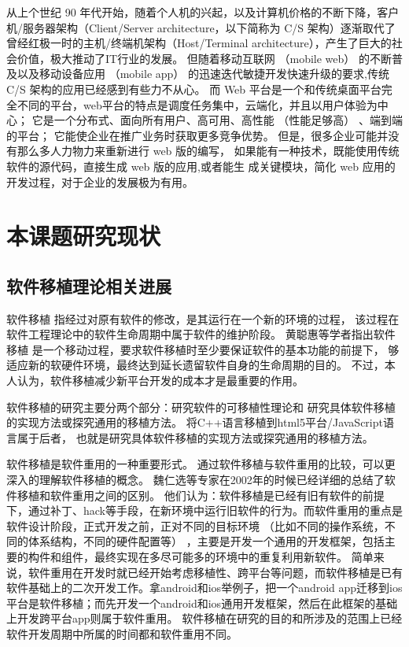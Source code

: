 从上个世纪 90 年代开始，随着个人机的兴起，以及计算机价格的不断下降，客户机/服务器架构（Client/Server architecture，以下简称为 C/S 架构）逐渐取代了
曾经红极一时的主机/终端机架构（Host/Terminal architecture），产生了巨大的社会价值，极大推动了IT行业的发展。
但随着移动互联网 （mobile web） 的不断普及以及移动设备应用 （mobile app） 的迅速迭代敏捷开发快速升级的要求,传统 C/S 架构的应用已经感到有些力不从心。
而 Web 平台是一个和传统桌面平台完全不同的平台，web平台的特点是调度任务集中，云端化，并且以用户体验为中心；
它是一个分布式、面向所有用户、高可用、高性能 （性能足够高） 、端到端的平台；
它能使企业在推广业务时获取更多竞争优势。
但是，很多企业可能并没有那么多人力物力来重新进行 web 版的编写，
如果能有一种技术，既能使用传统软件的源代码，直接生成 web 版的应用,或者能生 
成关键模块，简化 web 应用的开发过程，对于企业的发展极为有用。

\section{本课题研究现状}

\subsection{软件移植理论相关进展}

软件移植
指经过对原有软件的修改，是其运行在一个新的环境的过程，
该过程在软件工程理论中的软件生命周期中属于软件的维护阶段。
黄聪惠等学者指出软件移植
是一个移动过程，要求软件移植时至少要保证软件的基本功能的前提下，
够适应新的软硬件环境，最终达到延长遗留软件自身的生命周期的目的。
不过，本人认为，软件移植减少新平台开发的成本才是最重要的作用。

软件移植的研究主要分两个部分：研究软件的可移植性理论和
研究具体软件移植的实现方法或探究通用的移植方法。
将C++语言移植到html5平台/JavaScript语言属于后者，
也就是研究具体软件移植的实现方法或探究通用的移植方法。

软件移植是软件重用的一种重要形式。
通过软件移植与软件重用的比较，可以更深入的理解软件移植的概念。
魏仁选等专家在2002年的时候已经详细的总结了软件移植和软件重用之间的区别。
他们认为：软件移植是已经有旧有软件的前提下，通过补丁、hack等手段，在新环境中运行旧软件的行为。而软件重用的重点是软件设计阶段，正式开发之前，正对不同的目标环境 （比如不同的操作系统，不同的体系结构，不同的硬件配置等） ，主要是开发一个通用的开发框架，包括主要的构件和组件，最终实现在多尽可能多的环境中的重复利用新软件。
简单来说，软件重用在开发时就已经开始考虑移植性、跨平台等问题，而软件移植是已有软件基础上的二次开发工作。拿android和ios举例子，把一个android app迁移到ios平台是软件移植；而先开发一个android和ios通用开发框架，然后在此框架的基础上开发跨平台app则属于软件重用。
软件移植在研究的目的和所涉及的范围上已经软件开发周期中所属的时间都和软件重用不同。

